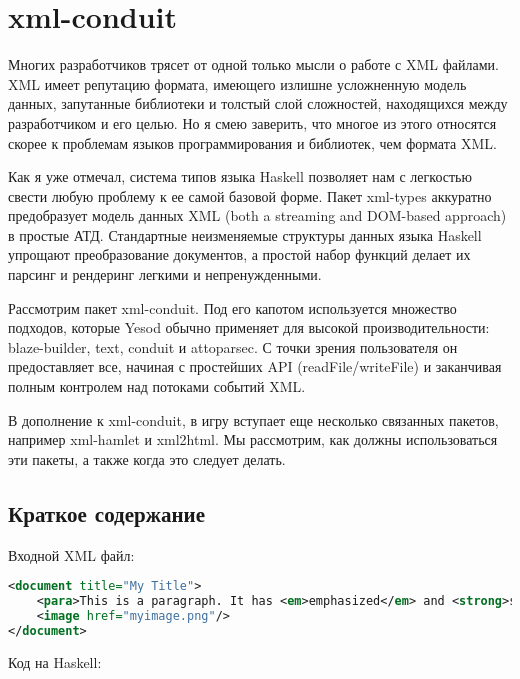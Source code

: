 \chapter{xml-conduit}


Многих разработчиков трясет от одной только мысли о работе с XML файлами. XML имеет репутацию формата, имеющего излишне усложненную модель данных, запутанные библиотеки и толстый слой сложностей, находящихся между разработчиком и его целью. Но я смею заверить, что многое из этого относятся скорее к проблемам языков программирования и библиотек, чем формата XML.

Как я уже отмечал, система типов языка Haskell позволяет нам с легкостью свести любую проблему к ее самой базовой форме. Пакет xml-types аккуратно предобразует модель данных XML (both a streaming and DOM-based approach) в простые АТД. Стандартные неизменяемые структуры данных языка Haskell упрощают преобразование документов, а простой набор функций делает их парсинг и рендеринг легкими и непренужденными. %

Рассмотрим пакет xml-conduit. Под его капотом используется множество подходов, которые Yesod обычно применяет для высокой производительности: blaze-builder, text, conduit и attoparsec. С точки зрения пользователя он предоставляет все, начиная с простейших API (readFile/writeFile) и заканчивая полным контролем над потоками событий XML.

В дополнение к xml-conduit, в игру вступает еще несколько связанных пакетов, например xml-hamlet и xml2html. Мы рассмотрим, как должны использоваться эти пакеты, а также когда это следует делать.

\section{Краткое содержание} %

Входной XML файл:

\begin{lstlisting}[language=XML]
<document title="My Title">
    <para>This is a paragraph. It has <em>emphasized</em> and <strong>strong</strong> words.</para>
    <image href="myimage.png"/>
</document>
\end{lstlisting}

Код на Haskell:

